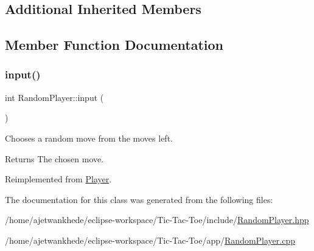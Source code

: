\subsection*{Additional Inherited Members}


\subsection{Member Function Documentation}
\mbox{\label{classRandomPlayer_a4b252647e976a08c1717d8db78bec23d}} 
\subsubsection{\texorpdfstring{input()}{input()}}
{\footnotesize\ttfamily int Random\+Player\+::input (\begin{DoxyParamCaption}{ }\end{DoxyParamCaption})\hspace{0.3cm}{\ttfamily [virtual]}}



Chooses a random move from the moves left. 

\begin{DoxyReturn}{Returns}
The chosen move. 
\end{DoxyReturn}


Reimplemented from \mbox{\hyperlink{classPlayer_a3e7c5ce7c59c8b5cc9d0b985a1baae91}{Player}}.



The documentation for this class was generated from the following files\+:\begin{DoxyCompactItemize}
\item 
/home/ajetwankhede/eclipse-\/workspace/\+Tic-\/\+Tac-\/\+Toe/include/\mbox{\hyperlink{RandomPlayer_8hpp}{Random\+Player.\+hpp}}\item 
/home/ajetwankhede/eclipse-\/workspace/\+Tic-\/\+Tac-\/\+Toe/app/\mbox{\hyperlink{RandomPlayer_8cpp}{Random\+Player.\+cpp}}\end{DoxyCompactItemize}
